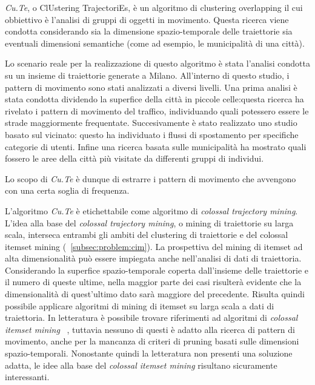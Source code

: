 \textit{Cu.Te}, o ClUstering TrajectoriEs, è un algoritmo di clustering overlapping il cui obbiettivo è l'analisi
di gruppi di oggetti in movimento. Questa ricerca viene condotta considerando sia la dimensione spazio-temporale
delle traiettorie sia eventuali dimensioni semantiche (come ad esempio, le municipalità di una città).

Lo scenario reale per la realizzazione di questo algoritmo è stata l'analisi condotta su
un insieme di traiettorie generate a Milano. All'interno di questo studio, i pattern di movimento sono
stati analizzati a diversi livelli.
Una prima analisi è stata condotta dividendo la superfice della città in piccole celle:questa ricerca
ha rivelato i pattern di movimento del traffico, individuando quali potessero essere le strade
maggiormente frequentate.
Succesivamente è stato realizzato uno studio basato sul vicinato: questo ha individuato i flussi di spostamento per specifiche categorie di utenti.
Infine una ricerca basata sulle municipalità ha mostrato quali fossero le aree della città più visitate da differenti gruppi di individui.

Lo scopo di \textit{Cu.Te} è dunque di estrarre i pattern di movimento che avvengono con una certa soglia di frequenza.

L'algoritmo \textit{Cu.Te} è etichettabile come algoritmo di \textit{colossal trajectory mining}.
L'idea alla base del \textit{colossal trajectory mining},
o mining di traiettorie su larga scala, interseca entrambi gli ambiti del clustering di traiettorie
e del colossal itemset mining (~\cref{subsec:problem:cim}).
La prospettiva del mining di itemset ad alta dimensionalità può essere impiegata anche nell'analisi di dati di traiettoria. Considerando la superfice
spazio-temporale coperta dall'insieme delle traiettorie e il numero di queste ultime, nella maggior parte dei casi risulterà evidente
che la dimensionalità di quest'ultimo dato sarà maggiore del precedente.
Risulta quindi possibile applicare algoritmi di mining di itemset su larga scala a dati di traiettoria.
In letteratura è possibile trovare riferimenti ad algoritmi di \textit{colossal itemset mining}~\cite{DBLP:journals/bdr/ApilettiBCGPM17, DBLP:conf/kdd/PanCTYZ03}
, tuttavia nessuno di questi è adatto alla ricerca di pattern di movimento, anche per la mancanza di
criteri di pruning basati sulle dimensioni spazio-temporali. Nonostante quindi la letteratura non
presenti una soluzione adatta, le idee alla base del \textit{colossal itemset mining} risultano sicuramente interessanti.

